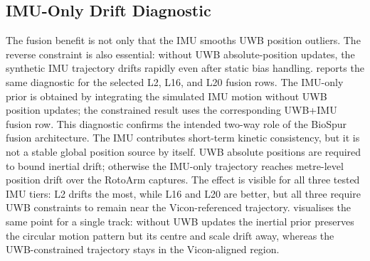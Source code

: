 \documentclass[11pt,a4paper]{article}
\begin{document}
\subsection{IMU-Only Drift Diagnostic}

The fusion benefit is not only that the IMU smooths UWB position outliers.
The reverse constraint is also essential: without UWB absolute-position updates, the synthetic IMU trajectory drifts rapidly even after static bias handling.
 reports the same diagnostic for the selected L2, L16, and L20 fusion rows.
The IMU-only prior is obtained by integrating the simulated IMU motion without UWB position updates; the constrained result uses the corresponding UWB+IMU fusion row.
This diagnostic confirms the intended two-way role of the BioSpur fusion architecture.
The IMU contributes short-term kinetic consistency, but it is not a stable global position source by itself.
UWB absolute positions are required to bound inertial drift; otherwise the IMU-only trajectory reaches metre-level position drift over the RotoArm captures.
The effect is visible for all three tested IMU tiers: L2 drifts the most, while L16 and L20 are better, but all three require UWB constraints to remain near the Vicon-referenced trajectory.
 visualises the same point for a single track: without UWB updates the inertial prior preserves the circular motion pattern but its centre and scale drift away, whereas the UWB-constrained trajectory stays in the Vicon-aligned region.
\end{document}
